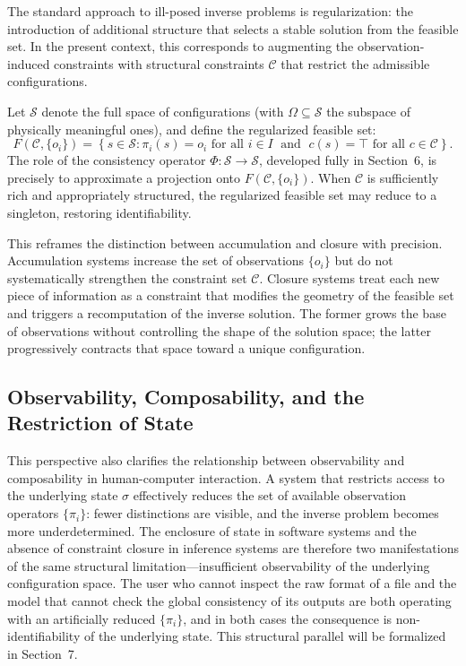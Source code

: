 \documentclass[12pt, oneside]{article}
\begin{document}
The standard approach to ill-posed inverse problems is regularization: the introduction of additional structure that selects a stable solution from the feasible set. In the present context, this corresponds to augmenting the observation-induced constraints with structural constraints $\mathcal{C}$ that restrict the admissible configurations.

Let $\mathcal{S}$ denote the full space of configurations (with $\Omega \subseteq \mathcal{S}$ the subspace of physically meaningful ones), and define the regularized feasible set:
\begin{equation}
  F(\mathcal{C}, \{o_i\}) = \left\{ s \in \mathcal{S} : \pi_i(s) = o_i \text{ for all } i \in I \;\text{ and }\; c(s) = \top \text{ for all } c \in \mathcal{C} \right\}.
\end{equation}
The role of the consistency operator $\Phi : \mathcal{S} \to \mathcal{S}$, developed fully in Section~6, is precisely to approximate a projection onto $F(\mathcal{C}, \{o_i\})$. When $\mathcal{C}$ is sufficiently rich and appropriately structured, the regularized feasible set may reduce to a singleton, restoring identifiability.

This reframes the distinction between accumulation and closure with precision. Accumulation systems increase the set of observations $\{o_i\}$ but do not systematically strengthen the constraint set $\mathcal{C}$. Closure systems treat each new piece of information as a constraint that modifies the geometry of the feasible set and triggers a recomputation of the inverse solution. The former grows the base of observations without controlling the shape of the solution space; the latter progressively contracts that space toward a unique configuration.

\subsection{Observability, Composability, and the Restriction of State}

This perspective also clarifies the relationship between observability and composability in human-computer interaction. A system that restricts access to the underlying state $\sigma$ effectively reduces the set of available observation operators $\{\pi_i\}$: fewer distinctions are visible, and the inverse problem becomes more underdetermined. The enclosure of state in software systems and the absence of constraint closure in inference systems are therefore two manifestations of the same structural limitation---insufficient observability of the underlying configuration space. The user who cannot inspect the raw format of a file and the model that cannot check the global consistency of its outputs are both operating with an artificially reduced $\{\pi_i\}$, and in both cases the consequence is non-identifiability of the underlying state. This structural parallel will be formalized in Section~7.
\end{document}
